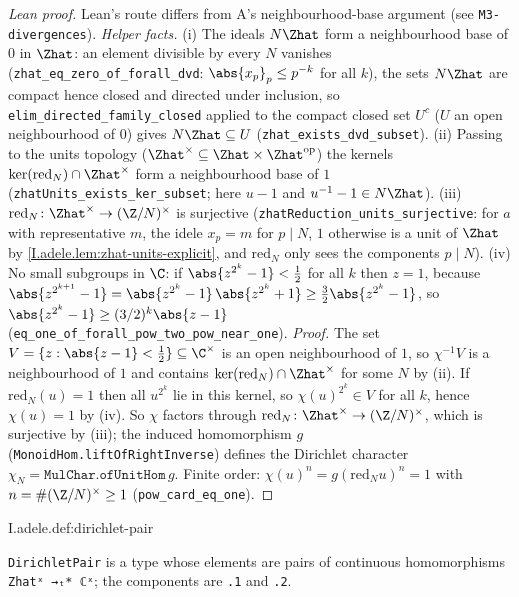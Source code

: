 \begin{proof}[Lean proof]
Lean's route differs from A's neighbourhood-base argument (see \texttt{M3-divergences}). \emph{Helper facts.} (i) The ideals $N\Zhat$ form a neighbourhood base of $0$ in $\Zhat$: an element divisible by every $N$ vanishes (\texttt{zhat\_eq\_zero\_of\_forall\_dvd}: $\abs{x_p}_p\le p^{-k}$ for all $k$), the sets $N\Zhat$ are compact hence closed and directed under inclusion, so \texttt{elim\_directed\_family\_closed} applied to the compact closed set $U^{c}$ ($U$ an open neighbourhood of $0$) gives $N\Zhat\subseteq U$ (\texttt{zhat\_exists\_dvd\_subset}). (ii) Passing to the units topology ($\Zhat^\times\subseteq\Zhat\times\Zhat^{\mathrm{op}}$) the kernels $\ker(\mathrm{red}_N)\cap\Zhat^\times$ form a neighbourhood base of $1$ (\texttt{zhatUnits\_exists\_ker\_subset}; here $u-1$ and $u^{-1}-1\in N\Zhat$). (iii) $\mathrm{red}_N\colon\Zhat^\times\to(\Z/N)^\times$ is surjective (\texttt{zhatReduction\_units\_surjective}: for $a$ with representative $m$, the idele $x_p=m$ for $p\mid N$, $1$ otherwise is a unit of $\Zhat$ by \cref{I.adele.lem:zhat-units-explicit}, and $\mathrm{red}_N$ only sees the components $p\mid N$). (iv) No small subgroups in $\C$: if $\abs{z^{2^k}-1}<\tfrac12$ for all $k$ then $z=1$, because $\abs{z^{2^{k+1}}-1}=\abs{z^{2^k}-1}\,\abs{z^{2^k}+1}\ge\tfrac32\abs{z^{2^k}-1}$, so $\abs{z^{2^k}-1}\ge(3/2)^k\abs{z-1}$ \,(\texttt{eq\_one\_of\_forall\_pow\_two\_pow\_near\_one}). \emph{Proof.} The set $V=\{z:\abs{z-1}<\tfrac12\}\subseteq\C^\times$ is an open neighbourhood of $1$, so $\chi^{-1}V$ is a neighbourhood of $1$ and contains $\ker(\mathrm{red}_N)\cap\Zhat^\times$ for some $N$ by (ii). If $\mathrm{red}_N(u)=1$ then all $u^{2^k}$ lie in this kernel, so $\chi(u)^{2^k}\in V$ for all $k$, hence $\chi(u)=1$ by (iv). So $\chi$ factors through $\mathrm{red}_N\colon\Zhat^\times\to(\Z/N)^\times$, which is surjective by (iii); the induced homomorphism $g$ (\texttt{MonoidHom.liftOfRightInverse}) defines the Dirichlet character $\chi_N=\texttt{MulChar.ofUnitHom}\,g$. Finite order: $\chi(u)^n=g(\mathrm{red}_N u)^{n}=1$ with $n=\#(\Z/N)^\times\ge1$ (\texttt{pow\_card\_eq\_one}).
\end{proof}

\begin{definition}
\end{definition}
\begin{tfformal}{I.adele.def:dirichlet-pair}
\begin{tffidelity}
\texttt{DirichletPair} is a type whose elements are pairs of continuous homomorphisms \texttt{Zhatˣ →ₜ* ℂˣ}; the components are \texttt{.1} and \texttt{.2}.
\end{tffidelity}
\end{tfformal}

